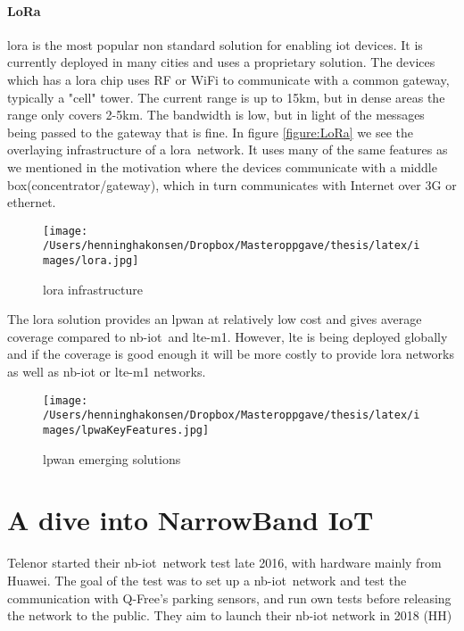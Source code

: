 \documentclass[USenglish]{ifimaster}  %
\begin{document}
\subsubsection{LoRa \cite{online:LoRa}}
\acrshort{lora} is the most popular non standard solution for enabling \acrshort{iot} devices. It is currently deployed in many cities and uses a proprietary solution. The devices which has a \acrshort{lora} chip uses RF or WiFi to communicate with a common gateway, typically a "cell" tower. The current range is up to 15km, but in dense areas the range only covers 2-5km. The bandwidth is low, but in light of the messages being passed to the gateway that is fine. In figure \vref{figure:LoRa} we see the overlaying infrastructure of a \acrshort{lora} network. It uses many of the same features as we mentioned in the motivation where the devices communicate with a middle box(concentrator/gateway), which in turn communicates with Internet over 3G or ethernet.

\begin{figure}[ht]
  \centering\texttt{[image: /Users/henninghakonsen/Dropbox/Masteroppgave/thesis/latex/images/lora.jpg]}
  \caption{\acrshort{lora} infrastructure \cite{online:LoRa}}
  \label{figure:LoRa}
\end{figure}

The \acrshort{lora} solution provides an \acrshort{lpwan} at relatively low cost and gives average coverage compared to \acrshort{nb-iot} and \acrshort{lte-m1}. However, \acrshort{lte} is being deployed globally and if the coverage is good enough it will be more costly to provide \acrshort{lora} networks as well as \acrshort{nb-iot} or \acrshort{lte-m1} networks.

\begin{figure}[ht]
  \centering\texttt{[image: /Users/henninghakonsen/Dropbox/Masteroppgave/thesis/latex/images/lpwaKeyFeatures.jpg]}
  \caption{\acrshort{lpwan} emerging solutions \cite{online:legacyWire}}
  \label{figure:legacyWire}
\end{figure}

\chapter{A dive into NarrowBand IoT} \label{section:nb-iot}
Telenor started their \acrshort{nb-iot} network test late 2016, with hardware mainly from Huawei. The goal of the test was to set up a \acrshort{nb-iot} network and test the communication with Q-Free's parking sensors, and run own tests before releasing the network to the public. They aim to launch their \acrshort{nb-iot} network in 2018 (HH)
\end{document}
